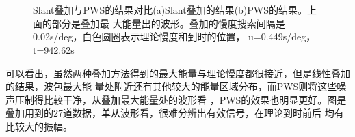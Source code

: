 \begin{figure}[tbph]
\centering
{}\\
\\
\caption{Slant叠加与PWS的结果对比(a)Slant叠加的结果(b)PWS的结果。上面的部分是叠加最%
大能量出的波形。叠加的慢度搜索间隔是0.02s/deg，白色圆圈表示理论慢度和到时的位置，%
u=0.449s/deg，t=942.62s}
\label{compare}
\end{figure}

可以看出，虽然两种叠加方法得到的最大能量与理论慢度都很接近，但是线性叠加的结果，波包最大能
量处附近还有其他较大的能量区域分布，而PWS则将这些噪声压制得比较干净，从叠加最大能量处的波形看
，PWS的效果也明显更好。图是叠加用到的27道数据，单从波形看，很难分辨出有效信号，在理论到时前后
均有比较大的振幅。

